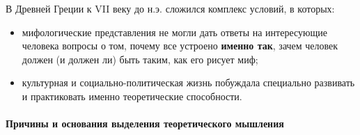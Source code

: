 

В Древней Греции к VII веку до н.э. сложился комплекс условий, в которых:
\begin{itemize}
    \item мифологические представления не могли дать ответы на интересующие человека вопросы о том, почему все устроено \textbf{именно так}, зачем человек должен (и должен ли) быть таким, как его рисует миф;
    \item культурная и социально-политическая жизнь побуждала специально развивать и практиковать именно теоретические способности.
\end{itemize}

\paragraph{Причины и основания выделения теоретического мышления}

